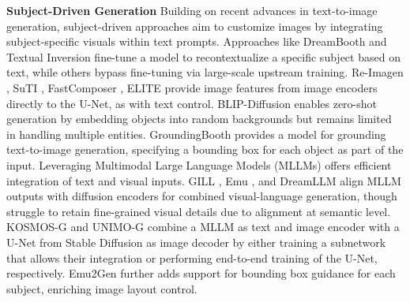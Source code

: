 \noindent
\textbf{Subject-Driven Generation} Building on recent advances in text-to-image generation, subject-driven approaches aim to customize images by integrating subject-specific visuals within text prompts. Approaches like DreamBooth \cite{ruiz2023dreambooth} and Textual Inversion \cite{gal2022inversion} fine-tune a model to recontextualize a specific subject based on text, while others \cite{chen2024suti,shi2023instantbooth,jia2023taming} bypass fine-tuning via large-scale upstream training. Re-Imagen \cite{chen2022re}, SuTI \cite{chen2024suti}, FastComposer \cite{xiao2024fastcomposer}, ELITE \cite{wei2023elite} provide image features from image encoders directly to the U-Net, as with text control. BLIP-Diffusion \cite{li2024blip} enables zero-shot generation by embedding objects into random backgrounds but remains limited in handling multiple entities. GroundingBooth \cite{xiong2024groundingbooth} provides a model for grounding text-to-image generation, specifying a bounding box for each object as part of the input. Leveraging Multimodal Large Language Models (MLLMs) \cite{wang2023cogvlm,driess2023palm,alayrac2022flamingo} offers efficient integration of text and visual inputs. GILL \cite{koh2024gill}, Emu \cite{sun2023emu}, and DreamLLM \cite{dong2023dreamllm} align MLLM outputs with diffusion encoders for combined visual-language generation, though struggle to retain fine-grained visual details due to alignment at semantic level. KOSMOS-G \cite{pan2023kosmos} and UNIMO-G \cite{li2024unimo} combine a MLLM as text and image encoder with a U-Net from Stable Diffusion as image decoder by either training a subnetwork that allows their integration or performing end-to-end training of the U-Net, respectively. Emu2Gen \cite{sun2024emugen} further adds support for bounding box guidance for each subject, enriching image layout control.


